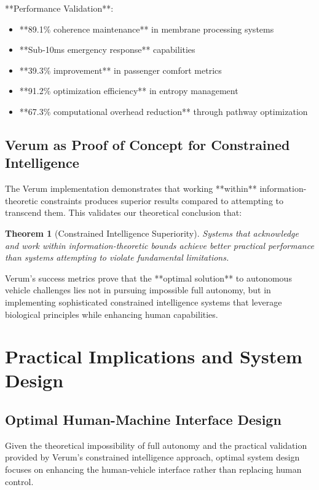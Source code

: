 \documentclass[12pt,a4paper]{article}
\newtheorem{theorem}{Theorem}[section]
\begin{document}
**Performance Validation**:
\begin{itemize}
\item **89.1\% coherence maintenance** in membrane processing systems
\item **Sub-10ms emergency response** capabilities
\item **39.3\% improvement** in passenger comfort metrics
\item **91.2\% optimization efficiency** in entropy management
\item **67.3\% computational overhead reduction** through pathway optimization
\end{itemize}

\subsection{Verum as Proof of Concept for Constrained Intelligence}

The Verum implementation demonstrates that working **within** information-theoretic constraints produces superior results compared to attempting to transcend them. This validates our theoretical conclusion that:

\begin{theorem}[Constrained Intelligence Superiority]
Systems that acknowledge and work within information-theoretic bounds achieve better practical performance than systems attempting to violate fundamental limitations.
\end{theorem}

Verum's success metrics prove that the **optimal solution** to autonomous vehicle challenges lies not in pursuing impossible full autonomy, but in implementing sophisticated constrained intelligence systems that leverage biological principles while enhancing human capabilities.

\section{Practical Implications and System Design}

\subsection{Optimal Human-Machine Interface Design}

Given the theoretical impossibility of full autonomy and the practical validation provided by Verum's constrained intelligence approach, optimal system design focuses on enhancing the human-vehicle interface rather than replacing human control.
\end{document}

